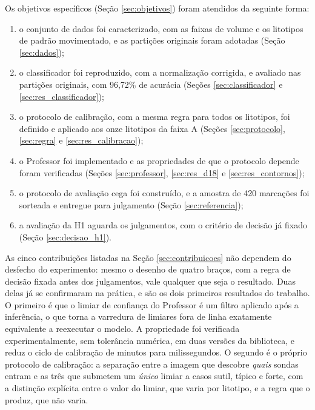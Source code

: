 Os objetivos específicos (Seção \ref{sec:objetivos}) foram atendidos da seguinte forma:

\begin{enumerate}
  \item o conjunto de dados foi caracterizado, com as faixas de volume e os litotipos de padrão movimentado, e as partições originais foram adotadas (Seção \ref{sec:dados});
  \item o classificador foi reproduzido, com a normalização corrigida, e avaliado nas partições originais, com 96,72\% de acurácia (Seções \ref{sec:classificador} e \ref{sec:res_classificador});
  \item o protocolo de calibração, com a mesma regra para todos os litotipos, foi definido e aplicado aos onze litotipos da faixa A (Seções \ref{sec:protocolo}, \ref{sec:regra} e \ref{sec:res_calibracao});
  \item o Professor foi implementado e as propriedades de que o protocolo depende foram verificadas (Seções \ref{sec:professor}, \ref{sec:res_d18} e \ref{sec:res_contornos});
  \item o protocolo de avaliação cega foi construído, e a amostra de 420 marcações foi sorteada e entregue para julgamento (Seção \ref{sec:referencia});
  \item a avaliação da H1 aguarda os julgamentos, com o critério de decisão já fixado (Seção \ref{sec:decisao_h1}).
\end{enumerate}

As cinco contribuições listadas na Seção \ref{sec:contribuicoes} não dependem do desfecho do experimento: mesmo o desenho de quatro braços, com a regra de decisão fixada antes dos julgamentos, vale qualquer que seja o resultado. Duas delas já se confirmaram na prática, e são os dois primeiros resultados do trabalho. O primeiro é que o limiar de confiança do Professor é um filtro aplicado após a inferência, o que torna a varredura de limiares fora de linha exatamente equivalente a reexecutar o modelo. A propriedade foi verificada experimentalmente, sem tolerância numérica, em duas versões da biblioteca, e reduz o ciclo de calibração de minutos para milissegundos. O segundo é o próprio protocolo de calibração: a separação entre a imagem que descobre \textit{quais} sondas entram e as três que submetem um \textit{único} limiar a casos sutil, típico e forte, com a distinção explícita entre o valor do limiar, que varia por litotipo, e a regra que o produz, que não varia.

